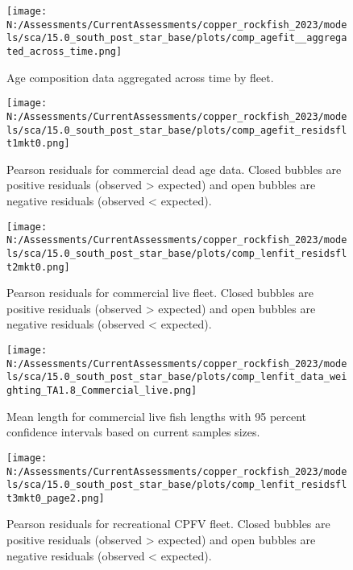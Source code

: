 \documentclass[11pt,
  english,
  letterpaper,
]{article}
\begin{document}
\pagebreak

\begin{figure}
\centering
\texttt{[image: N:/Assessments/CurrentAssessments/copper\_rockfish\_2023/models/sca/15.0\_south\_post\_star\_base/plots/comp\_agefit\_\_aggregated\_across\_time.png]}
\caption{Age composition data aggregated across time by fleet.\label{fig:agg-marg-age-fit}}
\end{figure}

\pagebreak

\begin{figure}
\centering
\texttt{[image: N:/Assessments/CurrentAssessments/copper\_rockfish\_2023/models/sca/15.0\_south\_post\_star\_base/plots/comp\_agefit\_residsflt1mkt0.png]}
\caption{Pearson residuals for commercial dead age data. Closed bubbles are positive residuals (observed \textgreater{} expected) and open bubbles are negative residuals (observed \textless{} expected).\label{fig:com-dead-age-pearson}}
\end{figure}

\pagebreak

\begin{figure}
\centering
\texttt{[image: N:/Assessments/CurrentAssessments/copper\_rockfish\_2023/models/sca/15.0\_south\_post\_star\_base/plots/comp\_lenfit\_residsflt2mkt0.png]}
\caption{Pearson residuals for commercial live fleet. Closed bubbles are positive residuals (observed \textgreater{} expected) and open bubbles are negative residuals (observed \textless{} expected).\label{fig:com-live-pearson}}
\end{figure}

\pagebreak

\begin{figure}
\centering
\texttt{[image: N:/Assessments/CurrentAssessments/copper\_rockfish\_2023/models/sca/15.0\_south\_post\_star\_base/plots/comp\_lenfit\_data\_weighting\_TA1.8\_Commercial\_live.png]}
\caption{Mean length for commercial live fish lengths with 95 percent confidence intervals based on current samples sizes.\label{fig:com-live-mean-len-fit}}
\end{figure}

\pagebreak

\begin{figure}
\centering
\texttt{[image: N:/Assessments/CurrentAssessments/copper\_rockfish\_2023/models/sca/15.0\_south\_post\_star\_base/plots/comp\_lenfit\_residsflt3mkt0\_page2.png]}
\caption{Pearson residuals for recreational CPFV fleet. Closed bubbles are positive residuals (observed \textgreater{} expected) and open bubbles are negative residuals (observed \textless{} expected).\label{fig:rec-cpfv-pearson}}
\end{figure}
\end{document}
